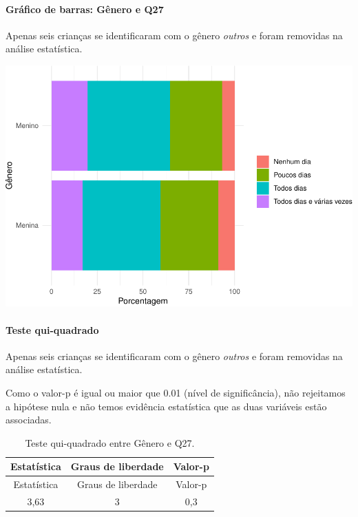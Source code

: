 \documentclass[]{article}
\let\oldparagraph\paragraph
\renewcommand{\paragraph}[1]{\oldparagraph{#1}\mbox{}}
\begin{document}
\hypertarget{gruxe1fico-de-barras-guxeanero-e-q27}{%
\paragraph{Gráfico de barras: Gênero e Q27}\label{gruxe1fico-de-barras-guxeanero-e-q27}}

Apenas seis crianças se identificaram com o gênero \emph{outros} e foram removidas na análise estatística.

\begin{center}\includegraphics[width=0.75\linewidth]{relatorio_covid19_files/figure-latex/unnamed-chunk-791-1} \end{center}

\hypertarget{teste-qui-quadrado-68}{%
\paragraph{Teste qui-quadrado}\label{teste-qui-quadrado-68}}

Apenas seis crianças se identificaram com o gênero \emph{outros} e foram removidas na análise estatística.

Como o valor-p é igual ou maior que 0.01 (nível de significância), não rejeitamos a hipótese nula e não temos evidência estatística que as duas variáveis estão associadas.

\begin{longtable}[]{@{}ccc@{}}
\caption{\label{tab:unnamed-chunk-793}Teste qui-quadrado entre Gênero e Q27.}\tabularnewline
\toprule
Estatística & Graus de liberdade & Valor-p\tabularnewline
\midrule
\endfirsthead
\toprule
Estatística & Graus de liberdade & Valor-p\tabularnewline
\midrule
\endhead
3,63 & 3 & 0,3\tabularnewline
\bottomrule
\end{longtable}

\cleardoublepage
\end{document}
